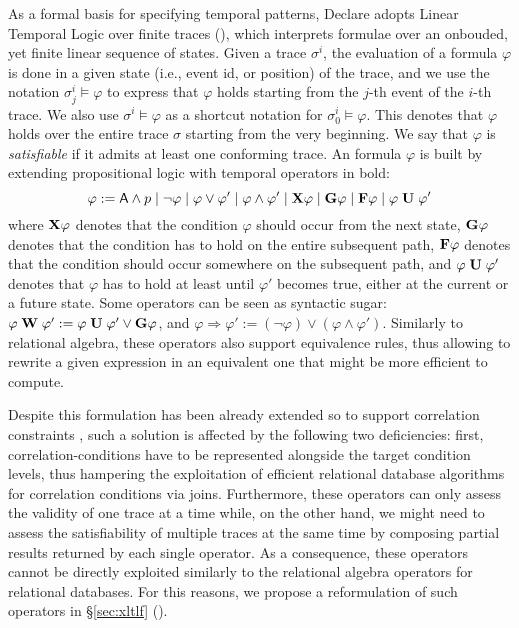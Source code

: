 As a formal basis for specifying temporal patterns, Declare adopts %
Linear Temporal Logic over finite traces (\LTLf), which interprets formulae over an onbouded, yet finite linear sequence of states. %
Given a trace $\sigma^i$, the evaluation of a formula $\varphi$ is done in a given state (i.e., event id, or position) of the trace, and we use the notation $\sigma^i_j\vDash\varphi$ to express that $\varphi$ holds starting from the $j$-th event of the $i$-th trace. We also use $\sigma^i\vDash\varphi$ as a shortcut notation for $\sigma^i_0\vDash\varphi$. This
 denotes that $\varphi$ holds over the entire trace $\sigma$ starting from the very beginning. %
 We say that $\varphi$ is \textit{satisfiable} if it admits at least one conforming trace. An \LTLf formula $\varphi$ is built by extending propositional logic with temporal operators in bold: \[\varphi:=\textsf{A}\wedge p\;|\;\neg \varphi\;|\;\varphi\vee \varphi'\;|\;\varphi\wedge\varphi'\;|\;\mathbf{X}{\varphi}\;|\;\mathbf{G}{\varphi}\;|\;\mathbf{F}{\varphi}\;|\;{\varphi}\;\mathbf{U}\;{\varphi'}\] where $\mathbf{X}{\varphi}$ denotes that the condition $\varphi$ should occur from the next state, $\mathbf{G}{\varphi}$ denotes that the condition has to hold on the entire subsequent path, $\mathbf{F}{\varphi}$ denotes that the condition should occur somewhere on the subsequent path, and ${\varphi}\;\mathbf{U}\;{\varphi'}$ denotes that $\varphi$ has to hold at least until $\varphi'$ becomes true, either at the current or a future state. Some operators can be seen as syntactic sugar: ${\varphi}\;\mathbf{W}\;{\varphi'}:={\varphi}\;\mathbf{U}\;{\varphi'}\vee\mathbf{G}{\varphi}$, and $\varphi\Rightarrow\varphi':=(\neg \varphi)\vee (\varphi\wedge \varphi')$. Similarly to relational algebra, these operators also support equivalence rules, thus allowing to rewrite a given \LTLf expression in an equivalent one that might be more efficient to compute.

Despite this formulation has been already extended so to support correlation constraints \cite{BurattinMS16}, such a solution is affected by the following two deficiencies: first, correlation-conditions have to be represented alongside the target condition levels, thus hampering the exploitation of efficient relational database algorithms for correlation conditions via joins. Furthermore, these operators can only assess the validity of one trace at a time while, on the other hand, we might need to assess the satisfiability of multiple traces at the same time by composing partial results returned by each single operator. As a consequence, these operators cannot be directly exploited similarly to the relational algebra operators for relational databases. For this reasons, we propose a reformulation of such operators in \S\ref{sec:xltlf} (\xLTLf). 
